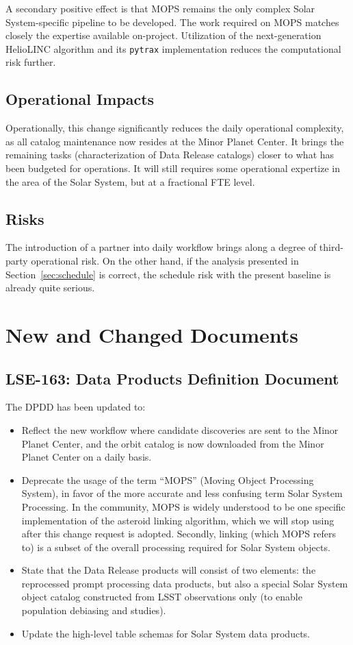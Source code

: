 \documentclass[DM,authoryear,toc,lsstdraft]{lsstdoc}
\begin{document}
A secondary positive effect is that MOPS remains the only complex Solar System-specific pipeline to be developed. The work required on MOPS matches closely the expertise available on-project. Utilization of the next-generation HelioLINC algorithm and its {\tt pytrax} implementation reduces the computational risk further.

\subsection{Operational Impacts}

Operationally, this change significantly reduces the daily operational complexity, as all catalog maintenance now resides at the Minor Planet Center. It brings the remaining tasks (characterization of Data Release catalogs) closer to what has been budgeted for operations. It will still requires some operational expertize in the area of the Solar System, but at a fractional FTE level.

\subsection{Risks}

The introduction of a partner into daily workflow brings along a degree of third-party operational risk. On the other hand, if the analysis presented in Section~\ref{sec:schedule} is correct, the schedule risk with the present baseline is already quite serious.

\section{New and Changed Documents}

\subsection{LSE-163: Data Products Definition Document}

The DPDD has been updated to:
\begin{itemize}
\item Reflect the new workflow where candidate discoveries are sent to the Minor Planet Center, and the orbit catalog is now downloaded from the Minor Planet Center on a daily basis.
\item Deprecate the usage of the term ``MOPS'' (Moving Object Processing System), in favor of the more accurate and less confusing term Solar System Processing. In the community, MOPS is widely understood to be one specific implementation of the asteroid linking algorithm, which we will stop using after this change request is adopted. Secondly, linking (which MOPS refers to) is a subset of the overall processing required for Solar System objects.
\item State that the Data Release products will consist of two elements: the reprocessed prompt processing data products, but also a special Solar System object catalog constructed from LSST observations only (to enable population debiasing and studies).
\item Update the high-level table schemas for Solar System data products.
\end{itemize}
\end{document}
